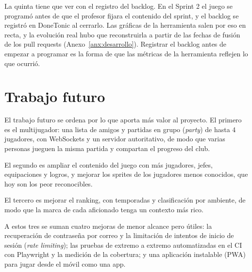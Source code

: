 La quinta tiene que ver con el registro del backlog. En el Sprint 2 el juego se programó antes de que el profesor fijara el contenido del sprint, y el backlog se registró en DoneTonic al cerrarlo. Las gráficas de la herramienta salen por eso en recta, y la evolución real hubo que reconstruirla a partir de las fechas de fusión de los pull requests (Anexo~\ref{anx:desarrollo}). Registrar el backlog antes de empezar a programar es la forma de que las métricas de la herramienta reflejen lo que ocurrió.

\section{Trabajo futuro}
\label{sec:trabajo-futuro}

El trabajo futuro se ordena por lo que aporta más valor al proyecto. El primero es el multijugador: una lista de amigos y partidas en grupo (\textit{party}) de hasta 4 jugadores, con WebSockets y un servidor autoritativo, de modo que varias personas jueguen la misma partida y compartan el progreso del club.

El segundo es ampliar el contenido del juego con más jugadores, jefes, equipaciones y logros, y mejorar los sprites de los jugadores menos conocidos, que hoy son los peor reconocibles.

El tercero es mejorar el ranking, con temporadas y clasificación por ambiente, de modo que la marca de cada aficionado tenga un contexto más rico.

A estos tres se suman cuatro mejoras de menor alcance pero útiles: la recuperación de contraseña por correo y la limitación de intentos de inicio de sesión (\textit{rate limiting}); las pruebas de extremo a extremo automatizadas en el CI con Playwright y la medición de la cobertura; y una aplicación instalable (PWA) para jugar desde el móvil como una app.
